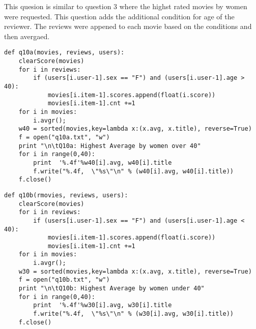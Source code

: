 \begin{flushleft}

This quesion is similar to question 3 where the highst rated movies by women were requested. This question adds the additional condition for age of the reviewer. The reviews were appened to each movie based on the conditions and then avergaed. 


\begin{lstlisting}[caption={Python code to for women over 40}]
def q10a(movies, reviews, users):
	clearScore(movies)
	for i in reviews:
		if (users[i.user-1].sex == "F") and (users[i.user-1].age > 40):
			movies[i.item-1].scores.append(float(i.score))
			movies[i.item-1].cnt +=1
	for i in movies:
		i.avgr(); 
	w40 = sorted(movies,key=lambda x:(x.avg, x.title), reverse=True)
	f = open("q10a.txt", "w")
	print "\n\tQ10a: Highest Average by women over 40"
	for i in range(0,40):
		print  '%.4f'%w40[i].avg, w40[i].title
		f.write("%.4f,  \"%s\"\n" % (w40[i].avg, w40[i].title))
	f.close()
\end{lstlisting}


\begin{lstlisting}[caption={Python code to for women under 40}]
def q10b(rmovies, reviews, users):
	clearScore(movies)
	for i in reviews:
		if (users[i.user-1].sex == "F") and (users[i.user-1].age < 40):
			movies[i.item-1].scores.append(float(i.score))
			movies[i.item-1].cnt +=1
	for i in movies:
		i.avgr(); 
	w30 = sorted(movies,key=lambda x:(x.avg, x.title), reverse=True)
	f = open("q10b.txt", "w")
	print "\n\tQ10b: Highest Average by women under 40"
	for i in range(0,40):
		print  '%.4f'%w30[i].avg, w30[i].title	
		f.write("%.4f,  \"%s\"\n" % (w30[i].avg, w30[i].title))
	f.close()
\end{lstlisting}




\end{flushleft}
